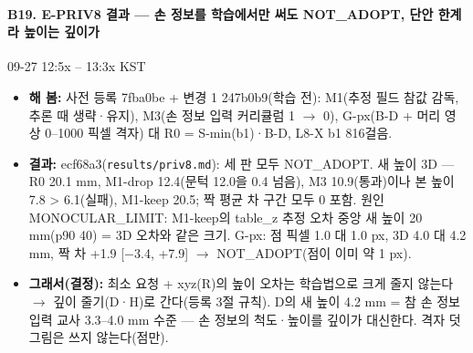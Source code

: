 \paragraph{B19. E-PRIV8 결과 --- 손 정보를 학습에서만 써도 NOT\_ADOPT, 단안 한계라 높이는 깊이가}
{\small 09-27 12:5x -- 13:3x KST}
\begin{itemize}
  \item \textbf{해 봄:} 사전 등록 7fba0be + 변경 1 247b0b9(학습 전): M1(추정 필드 참값 감독, 추론 때 생략·유지), M3(손 정보 입력 커리큘럼 1 $\rightarrow$ 0), G-px(B-D + 머리 영상 0--1000 픽셀 격자) 대 R0 = S-min(b1)·B-D, L8-X b1 816걸음.
  \item \textbf{결과:} ecf68a3(\texttt{results/\allowbreak{}priv8.\allowbreak{}md}): 세 판 모두 NOT\_ADOPT. 새 높이 3D --- R0 20.1 mm, M1-drop 12.4(문턱 12.0을 0.4 넘음), M3 10.9(통과)이나 본 높이 7.8 > 6.1(실패), M1-keep 20.5; 짝 평균 차 구간 모두 0 포함. 원인 MONOCULAR\_LIMIT: M1-keep의 table\_z 추정 오차 중앙 새 높이 20 mm(p90 40) = 3D 오차와 같은 크기. G-px: 점 픽셀 1.0 대 1.0 px, 3D 4.0 대 4.2 mm, 짝 차 +1.9 [$-$3.4, +7.9] $\rightarrow$ NOT\_ADOPT(점이 이미 약 1 px).
  \item \textbf{그래서(결정):} 최소 요청 + xyz(R)의 높이 오차는 학습법으로 크게 줄지 않는다 $\rightarrow$ 깊이 줄기(D·H)로 간다(등록 3절 규칙). D의 새 높이 4.2 mm = 참 손 정보 입력 교사 3.3--4.0 mm 수준 --- 손 정보의 척도·높이를 깊이가 대신한다. 격자 덧그림은 쓰지 않는다(점만).
\end{itemize}

